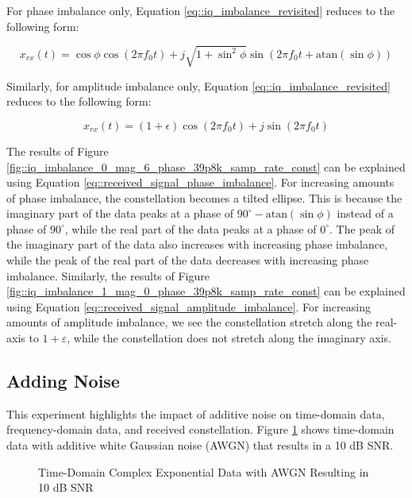 \documentclass{article}
\begin{document}
For phase imbalance only, Equation \ref{eq::iq_imbalance_revisited} reduces to the following form:

\begin{equation}
	x_{rx}(t) = \cos\phi\cos(2{\pi}f_0t) + j\sqrt{1+\sin^2\phi}\sin(2{\pi}f_0t + \text{atan}(\sin\phi)) \label{eq::received_signal_phase_imbalance}
\end{equation}

Similarly, for amplitude imbalance only, Equation \ref{eq::iq_imbalance_revisited} reduces to the following form:

\begin{equation}
	x_{rx}(t) = (1+\epsilon)\cos(2{\pi}f_0t) + j\sin(2{\pi}f_0t)
\label{eq::received_signal_amplitude_imbalance}
\end{equation}

The results of Figure \ref{fig::iq_imbalance_0_mag_6_phase_39p8k_samp_rate_const} can be explained using Equation \ref{eq::received_signal_phase_imbalance}. For increasing amounts of phase imbalance, the constellation becomes a tilted ellipse. This is because the imaginary part of the data peaks at a phase of $90^{\circ} - \text{atan}(\sin\phi)$ instead of a phase of $90^{\circ}$, while the real part of the data peaks at a phase of $0^{\circ}$. The peak of the imaginary part of the data also increases with increasing phase imbalance, while the peak of the real part of the data decreases with increasing phase imbalance. Similarly, the results of Figure \ref{fig::iq_imbalance_1_mag_0_phase_39p8k_samp_rate_const} can be explained using Equation \ref{eq::received_signal_amplitude_imbalance}. For increasing amounts of amplitude imbalance, we see the constellation stretch along the real-axis to $1+\varepsilon$, while the constellation does not stretch along the imaginary axis.

\subsection{Adding Noise}

This experiment highlights the impact of additive noise on time-domain data, frequency-domain data, and received constellation. Figure \ref{fig::noise_time_domain_10dB_snr} shows time-domain data with additive white Gaussian noise (AWGN) that results in a 10 dB SNR.

\begin{figure}[H]
	\centerline{}
	\caption{Time-Domain Complex Exponential Data with AWGN Resulting in 10 dB SNR}
	\label{fig::noise_time_domain_10dB_snr}
\end{figure}
\end{document}
